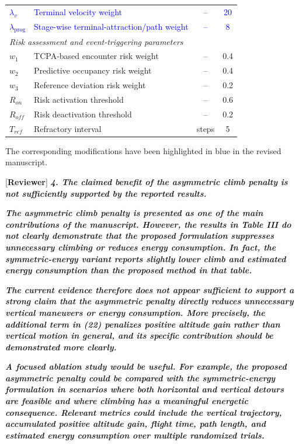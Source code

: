 \documentclass[12pt, twosides]{article}
\theoremstyle{definition}
\begin{document}
\begin{table}[h!]
{\begin{tabular}{l l c c}
\textcolor{blue}{$\lambda_v$} & \textcolor{blue}{Terminal velocity weight} & \textcolor{blue}{--} & \textcolor{blue}{20} \\
\textcolor{blue}{$\lambda_{\mathrm{prog}}$} & \textcolor{blue}{Stage-wise terminal-attraction/path weight} & \textcolor{blue}{--} & \textcolor{blue}{8} \\
\midrule
\multicolumn{4}{l}{\textit{Risk assessment and event-triggering parameters}} \\
\midrule
$w_1$ & TCPA-based encounter risk weight & -- & 0.4 \\
$w_2$ & Predictive occupancy risk weight & -- & 0.4 \\
$w_3$ & Reference deviation risk weight & -- & 0.2 \\
$R_{on}$ & Risk activation threshold & -- & 0.6 \\
$R_{off}$ & Risk deactivation threshold & -- & 0.2 \\
$T_{ref}$ & Refractory interval & steps & 5 \\
\bottomrule
\end{tabular}%
}
\end{table}

The corresponding modifications have been highlighted in blue in the revised manuscript.

\medskip

\textcolor[rgb]{0.00,0.00,1.00}{[\textbf {Reviewer}]} \textit{\textbf{4. The claimed benefit of the asymmetric climb penalty is not sufficiently supported by the reported results.}}

\textit{\textbf{The asymmetric climb penalty is presented as one of the main contributions of the manuscript. However, the results in Table III do not clearly demonstrate that the proposed formulation suppresses unnecessary climbing or reduces energy consumption. In fact, the symmetric-energy variant reports slightly lower climb and estimated energy consumption than the proposed method in that table.}}

\textit{\textbf{The current evidence therefore does not appear sufficient to support a strong claim that the asymmetric penalty directly reduces unnecessary vertical maneuvers or energy consumption. More precisely, the additional term in (22) penalizes positive altitude gain rather than vertical motion in general, and its specific contribution should be demonstrated more clearly.}}

\textit{\textbf{A focused ablation study would be useful. For example, the proposed asymmetric penalty could be compared with the symmetric-energy formulation in scenarios where both horizontal and vertical detours are feasible and where climbing has a meaningful energetic consequence. Relevant metrics could include the vertical trajectory, accumulated positive altitude gain, flight time, path length, and estimated energy consumption over multiple randomized trials.}}
\end{document}
